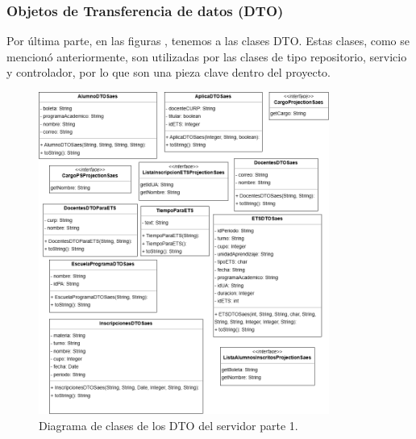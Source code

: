 \subsubsection{Objetos de Transferencia de datos (DTO)}
Por última parte, en las figuras , tenemos a las clases DTO. Estas clases, como se mencionó anteriormente, son utilizadas por las clases de tipo repositorio, servicio y controlador, por lo que son una pieza clave dentro del proyecto.


\begin{figure}[htbp!]
	\begin{center}
		\includegraphics[width=0.85\textwidth]{Clases/DTO1.png}
		\caption{Diagrama de clases de los DTO del servidor parte 1.}
		\label{fig:DTO1}
	\end{center}
\end{figure}

